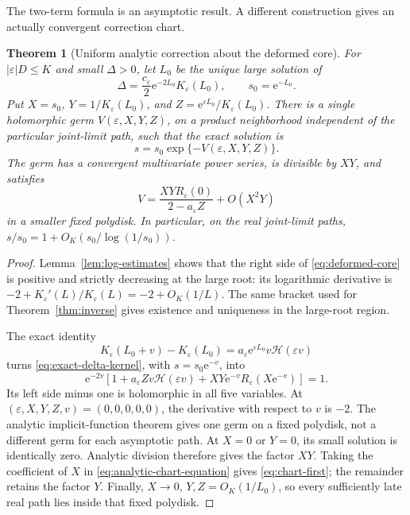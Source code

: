 \documentclass[11pt,a4paper]{article}
\numberwithin{equation}{section}
\newtheorem{theorem}{Theorem}[section]
\theoremstyle{definition}
\theoremstyle{remark}
\newcommand{\eps}{\varepsilon}
\newcommand{\ee}{\mathrm e}
\newcommand{\hc}{\mathcal H}
\newcommand{\KK}{K_{\eps}}
\begin{document}
The two-term formula is an asymptotic result. A different construction gives
an actually convergent correction chart.

\begin{theorem}[Uniform analytic correction about the deformed core]
\label{thm:chart}
For \(|\eps|D\le K\) and small \(\Delta>0\), let \(L_0\) be the unique
large solution of
\begin{equation}
 \Delta=\frac{c_{\eps}}2\ee^{-2L_0}\KK(L_0),\qquad s_0=\ee^{-L_0}.
 \label{eq:deformed-core}
\end{equation}
Put \(X=s_0\), \(Y=1/\KK(L_0)\), and
\(Z=\ee^{\eps L_0}/\KK(L_0)\). There is a single holomorphic germ
\(V(\eps,X,Y,Z)\), on a product neighborhood independent of the particular
joint-limit path, such that the exact solution is
\begin{equation}
 s=s_0\exp\{-V(\eps,X,Y,Z)\}.
 \label{eq:chart}
\end{equation}
The germ has a convergent multivariate power series, is divisible by \(XY\),
and satisfies
\begin{equation}
 V=\frac{XYR_{\eps}(0)}{2-a_{\eps}Z}
       +O(X^2Y)
 \label{eq:chart-first}
\end{equation}
in a smaller fixed polydisk. In particular, on the real joint-limit paths,
\(s/s_0=1+O_K(s_0/\log(1/s_0))\).
\end{theorem}
\begin{proof}
Lemma~\ref{lem:log-estimates} shows that the right side of
\eqref{eq:deformed-core} is positive and strictly decreasing at the large
root: its logarithmic derivative is
\(-2+\KK'(L)/\KK(L)=-2+O_K(1/L)\).
The same bracket used for Theorem~\ref{thm:inverse} gives existence and
uniqueness in the large-root region.

The exact identity
\[
 \KK(L_0+v)-\KK(L_0)
 =a_{\eps}\ee^{\eps L_0}v\hc(\eps v)
\]
turns \eqref{eq:exact-delta-kernel}, with \(s=s_0\ee^{-v}\), into
\begin{equation}
 \ee^{-2v}\left[
 1+a_{\eps}Zv\hc(\eps v)
 +XY\ee^{-v}R_{\eps}(X\ee^{-v})\right]=1.
 \label{eq:analytic-chart-equation}
\end{equation}
Its left side minus one is holomorphic in all five variables. At
\((\eps,X,Y,Z,v)=(0,0,0,0,0)\), the derivative with respect to \(v\) is
\(-2\). The analytic implicit-function theorem gives one germ on a fixed
polydisk, not a different germ for each asymptotic path. At \(X=0\) or
\(Y=0\), its small solution is identically zero. Analytic division therefore
gives the factor \(XY\). Taking the coefficient of \(X\) in
\eqref{eq:analytic-chart-equation} gives \eqref{eq:chart-first}; the
remainder retains the factor \(Y\). Finally,
\(X\to0\), \(Y,Z=O_K(1/L_0)\), so every sufficiently late real path lies
inside that fixed polydisk.
\end{proof}
\end{document}

